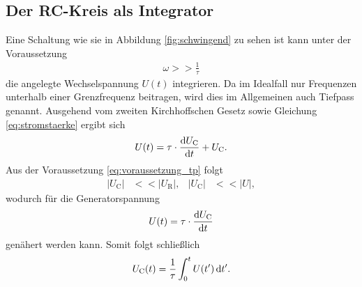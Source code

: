 \subsection{Der RC-Kreis als Integrator}
Eine Schaltung wie sie in Abbildung \ref{fig:schwingend} zu sehen ist kann unter der Voraussetzung
\begin{align}
    \omega >> \frac{1}{\tau}
    \label{eq:voraussetzung_tp} 
\end{align}
die angelegte Wechselspannung $U(t)$ integrieren.
Da im Idealfall nur Frequenzen unterhalb einer Grenzfrequenz beitragen, wird dies im Allgemeinen auch Tiefpass genannt.
Ausgehend vom zweiten Kirchhoffschen Gesetz sowie Gleichung \eqref{eq:stromstaerke} ergibt sich
\begin{align}
    U(t) = \tau \cdot \frac{\mathop{}\!\mathrm{d}{U_\text{C}}}{\mathop{}\!\mathrm{d}{t}} + U_\text{C}.
\end{align}
Aus der Voraussetzung \eqref{eq:voraussetzung_tp} folgt
\begin{align}
    |U_\text{C}| &<< |U_\text{R}|, & |U_\text{C}| &<< |U|,
\end{align}
wodurch für die Generatorspannung 
\begin{align*}
    U(t) = \tau \cdot \frac{\mathop{}\!\mathrm{d}{U_\text{C}}}{\mathop{}\!\mathrm{d}{t}}
\end{align*}
genähert werden kann.
Somit folgt schließlich
\begin{align}
    U_\text{C}(t) = \frac{1}{\tau} \int_0^t U(t') \mathop{}\!\mathrm{d}{t'}.
\end{align}